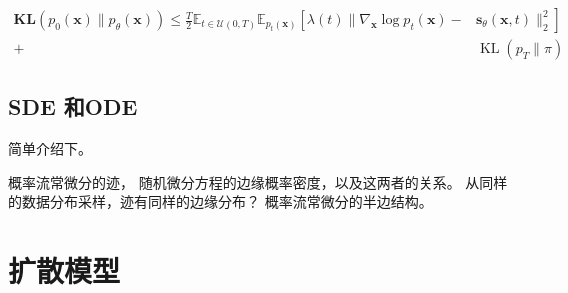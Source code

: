\documentclass[lang=cn,newtx,10pt,scheme=chinese]{elegantbook}
\begin{document}
\begin{equation}
  \begin{aligned} \mathbf{KL}\left(p_0(\mathbf{x}) \| p_\theta(\mathbf{x})\right) \leq \frac{T}{2} \mathbb{E}_{t \in \mathcal{U}(0, T)} \mathbb{E}_{p_t(\mathbf{x})}\left[\lambda(t) \| \nabla_{\mathbf{x}} \log p_t(\mathbf{x})-\right. 
    & \left.\mathbf{s}_\theta(\mathbf{x}, t) \|_2^2\right] \\ + 
    & \operatorname{KL}\left(p_T \| \pi\right)
  \end{aligned}
\end{equation}

\section{SDE 和ODE}
简单介绍下。

概率流常微分的迹，
随机微分方程的边缘概率密度，以及这两者的关系。
从同样的数据分布采样，迹有同样的边缘分布？
概率流常微分的半边结构。



\chapter{扩散模型}
\end{document}
